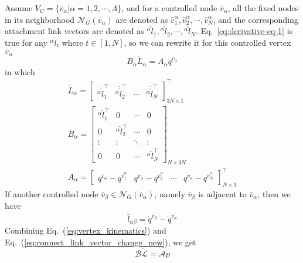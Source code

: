 \documentclass[journal]{IEEEtran}
\begin{document}
Assume $V_C = \{\bar{v}_{\alpha}\vert \alpha = 1,2,\cdots,\Lambda\}$,
and for a controlled node $\bar{v}_{\alpha}$, all the fixed nodes in
its neighborhood $\mathcal{N}_G(\bar{v}_{\alpha})$ are denoted as
$\hat{v}_1^{\alpha}, \hat{v}_2^\alpha, \cdots, \hat{v}_N^\alpha$, and
the corresponding attachment link vectors are denoted as
${^{\alpha}}\hat{l}_1, {^{\alpha}}\hat{l}_2, \cdots,
{^{\alpha}}\hat{l}_N$. Eq.~\eqref{eq:derivative-eq-1} is true for any
${^\alpha}\hat{l}_t$ where $t \in \left[1, N\right]$, so we can
rewrite it for this controlled vertex $\bar{v}_{\alpha}$
\begin{equation}
  \label{eq:vertex_kinematics}
  B_\alpha\dot{L}_\alpha = A_\alpha\dot{q}^{\bar{v}_{\alpha}}
\end{equation}
in which
\begin{gather*}
  \dot{L}_\alpha = \left[
    \begin{array}{cccc}
      {^\alpha}\dot{\hat{l}}_1^\intercal&{^\alpha}\dot{\hat{l}}_2^\intercal&\cdots&{^\alpha}\dot{\hat{l}}_N^\intercal
    \end{array}
  \right]^\intercal_{3N\times1}\\
  B_\alpha = \left[
    \begin{array}{cccc}
      {^\alpha}\hat{l}_1^{\intercal}&0&\cdots&0\\
      0&{^\alpha}\hat{l}_2^{\intercal}&\cdots&0\\
      \vdots&\vdots&\ddots&\vdots\\
      0&0&\cdots&{^\alpha}\hat{l}_N^{\intercal}
    \end{array}
  \right]_{N\times3N}\\
  A_\alpha = \left[
    \begin{array}{cccc}
      q^{\bar{v}_{\alpha}} - q^{\hat{v}_1^{\alpha}} &
      q^{\bar{v}_{\alpha}} - q^{\hat{v}_2^{\alpha}} &
      \cdots&
      q^{\bar{v}_{\alpha}} - q^{\hat{v}_N^{\alpha}}
    \end{array}
  \right]^\intercal_{N\times3}
\end{gather*}
If another controlled node
$\bar{v}_{\beta}\in \mathcal{N}_G(\bar{v}_{\alpha})$, namely
$\bar{v}_{\beta}$ is adjacent to $\bar{v}_{\alpha}$, then we have
\begin{equation}
  \label{eq:connect_link_vector_change_new}
  \dot{\bar{l}}_{\alpha\beta} = \dot{q}^{\bar{v}_{\beta}} - \dot{q}^{\bar{v}_{\alpha}}
\end{equation}
Combining Eq.~(\ref{eq:vertex_kinematics}) and
Eq.~(\ref{eq:connect_link_vector_change_new}), we get
\begin{equation}
  \label{eq:kinematics_eq}
  \mathcal{B}\dot{\mathcal{L}} = \mathcal{A}\dot{p}
\end{equation}
\end{document}
